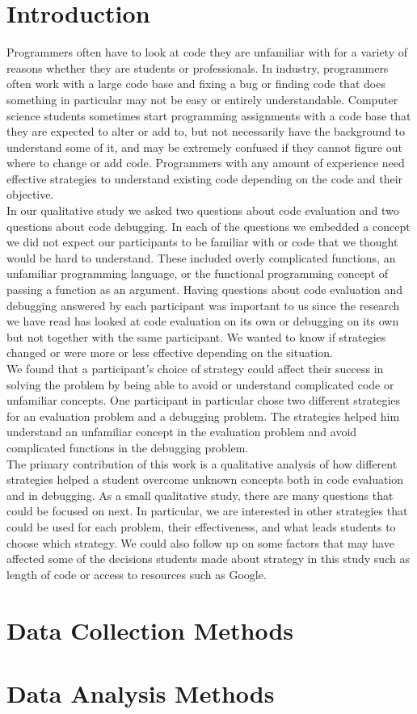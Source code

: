 \documentclass{article}
\begin{document}
\newpage
\section{Introduction}

Programmers often have to look at code they are unfamiliar with for a variety of reasons whether they are students or professionals. In industry, programmers often work with a large code base and fixing a bug or finding code that does something in particular may not be easy or entirely understandable. Computer science students sometimes start programming assignments with a code base that they are expected to alter or add to, but not necessarily have the background to understand some of it, and may be extremely confused if they cannot figure out where to change or add code. Programmers with any amount of experience need effective strategies to understand existing code depending on the code and their objective. \\

In our qualitative study we asked two questions about code evaluation and two questions about code debugging. In each of the questions we embedded a concept we did not expect our participants to be familiar with or code that we thought would be hard to understand. These included overly complicated functions, an unfamiliar programming language, or the functional programming concept of passing a function as an argument. Having questions about code evaluation and debugging answered by each participant was important to us since the research we have read has looked at code evaluation on its own or debugging on its own but not together with the same participant. We wanted to know if strategies changed or were more or less effective depending on the situation. \\

We found that a participant's choice of strategy could affect their success in solving the problem by being able to avoid or understand complicated code or unfamiliar concepts. One participant in particular chose two different strategies for an evaluation problem and a debugging problem. The strategies helped him understand an unfamiliar concept in the evaluation problem and avoid complicated functions in the debugging problem. \\

The primary contribution of this work is a qualitative analysis of how different strategies helped a student overcome unknown concepts both in code evaluation and in debugging. As a small qualitative study, there are many questions that could be focused on next. In particular, we are interested in other strategies that could be used for each problem, their effectiveness, and what leads students to choose which strategy. We could also follow up on some factors that may have affected some of the decisions students made about strategy in this study such as length of code or access to resources such as Google.\\

\newpage
\section{Data Collection Methods}

\newpage
\section{Data Analysis Methods}
\end{document}
